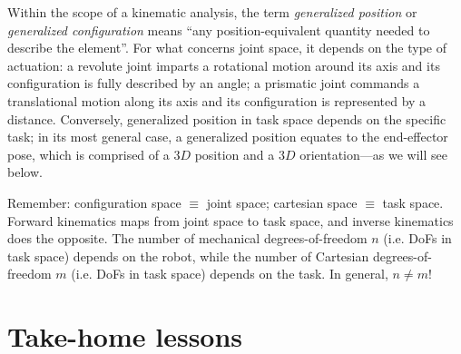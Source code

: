 Within the scope of a kinematic analysis, the term \textsl{generalized position} or \textsl{generalized configuration} means ``any position-equivalent quantity needed to describe the element''.
For what concerns joint space, it depends on the type of actuation: a revolute joint imparts a rotational motion around its axis and its configuration is fully described by an angle; a prismatic joint commands a translational motion along its axis and its configuration is represented by a distance.
Conversely, generalized position in task space depends on the specific task; in its most general case, a generalized position equates to the end-effector pose, which is comprised of a $3D$ position and a $3D$ orientation---as we will see below.

\begin{mdframed}
\noindent Remember:
configuration space $\equiv$ joint space;
cartesian space $\equiv$ task space.
Forward kinematics maps from joint space to task space, and inverse kinematics does the opposite.
The number of mechanical degrees-of-freedom $n$ (i.e. DoFs in task space) depends on the robot, while the number of Cartesian degrees-of-freedom $m$ (i.e. DoFs in task space) depends on the task. In general, $n \neq m$!
\end{mdframed}







\section*{Take-home lessons}

